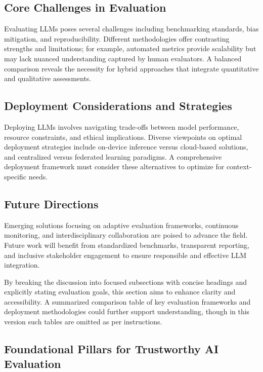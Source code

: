 \documentclass[sigconf]{acmart}
\begin{document}
\subsection{Core Challenges in Evaluation}
Evaluating LLMs poses several challenges including benchmarking standards, bias mitigation, and reproducibility. Different methodologies offer contrasting strengths and limitations; for example, automated metrics provide scalability but may lack nuanced understanding captured by human evaluators. A balanced comparison reveals the necessity for hybrid approaches that integrate quantitative and qualitative assessments.

\subsection{Deployment Considerations and Strategies}
Deploying LLMs involves navigating trade-offs between model performance, resource constraints, and ethical implications. Diverse viewpoints on optimal deployment strategies include on-device inference versus cloud-based solutions, and centralized versus federated learning paradigms. A comprehensive deployment framework must consider these alternatives to optimize for context-specific needs.

\subsection{Future Directions}
Emerging solutions focusing on adaptive evaluation frameworks, continuous monitoring, and interdisciplinary collaboration are poised to advance the field. Future work will benefit from standardized benchmarks, transparent reporting, and inclusive stakeholder engagement to ensure responsible and effective LLM integration.

By breaking the discussion into focused subsections with concise headings and explicitly stating evaluation goals, this section aims to enhance clarity and accessibility. A summarized comparison table of key evaluation frameworks and deployment methodologies could further support understanding, though in this version such tables are omitted as per instructions.

\subsection{Foundational Pillars for Trustworthy AI Evaluation}
\end{document}

